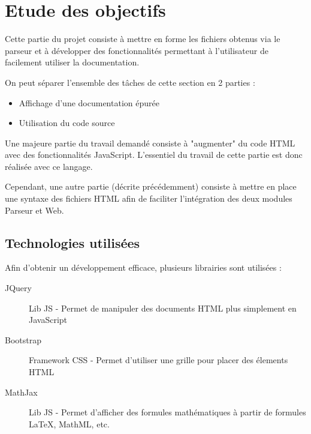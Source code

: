\chapter{Etude des objectifs}

Cette partie du projet consiste à mettre en forme les fichiers obtenus via le parseur et à développer des fonctionnalités permettant à l'utilisateur de facilement utiliser la documentation.\par\bigskip

On peut séparer l'ensemble des tâches de cette section en 2 parties :
\begin{itemize}
\item Affichage d'une documentation épurée
\item Utilisation du code source
\end{itemize}\par\bigskip

Une majeure partie du travail demandé consiste à "augmenter" du code HTML avec des fonctionnalités JavaScript. L'essentiel du travail de cette partie est donc réalisée avec ce langage.\par

Cependant, une autre partie (décrite précédemment) consiste à mettre en place une syntaxe des fichiers HTML afin de faciliter l'intégration des deux modules Parseur et Web.

\section{Technologies utilisées}

Afin d'obtenir un développement efficace, plusieurs librairies sont utilisées :
\begin{description}
  \item[JQuery] Lib JS - Permet de manipuler des documents HTML plus simplement en JavaScript
  \item[Bootstrap] Framework CSS - Permet d'utiliser une grille pour placer des élements HTML 
  \item[MathJax] Lib JS - Permet d'afficher des formules mathématiques à partir de formules LaTeX, MathML, etc.
\end{description}